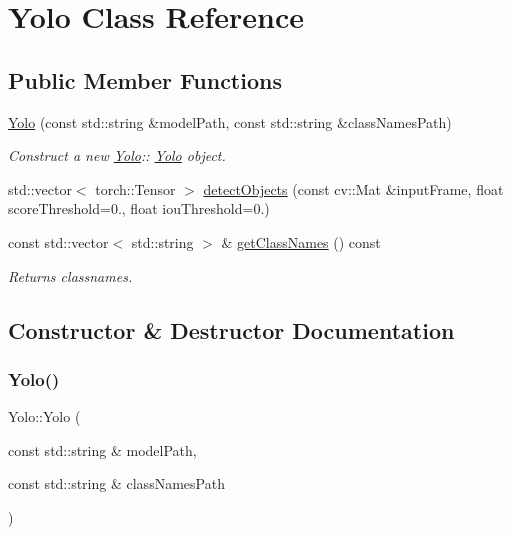 \hypertarget{classYolo}{}\section{Yolo Class Reference}
\label{classYolo}
\subsection*{Public Member Functions}
\begin{DoxyCompactItemize}
\item 
\hyperlink{classYolo_a1824392c7c2bd0212cef879b1807cd12}{Yolo} (const std\+::string \&model\+Path, const std\+::string \&class\+Names\+Path)
\begin{DoxyCompactList}\small\item\em Construct a new \hyperlink{classYolo}{Yolo}\+:\+: \hyperlink{classYolo}{Yolo} object. \end{DoxyCompactList}\item 
std\+::vector$<$ torch\+::\+Tensor $>$ \hyperlink{classYolo_af5b9abc491315d152df541b5678e71e1}{detect\+Objects} (const cv\+::\+Mat \&input\+Frame, float score\+Threshold=0., float iou\+Threshold=0.)
\item 
const std\+::vector$<$ std\+::string $>$ \& \hyperlink{classYolo_a567d594b2d190ab5131c7774186b2d0b}{get\+Class\+Names} () const
\begin{DoxyCompactList}\small\item\em Returns classnames. \end{DoxyCompactList}\end{DoxyCompactItemize}


\subsection{Constructor \& Destructor Documentation}
\mbox{\label{classYolo_a1824392c7c2bd0212cef879b1807cd12}} 
\subsubsection{\texorpdfstring{Yolo()}{Yolo()}}
{\footnotesize\ttfamily Yolo\+::\+Yolo (\begin{DoxyParamCaption}\item[{const std\+::string \&}]{model\+Path,  }\item[{const std\+::string \&}]{class\+Names\+Path }\end{DoxyParamCaption})}



